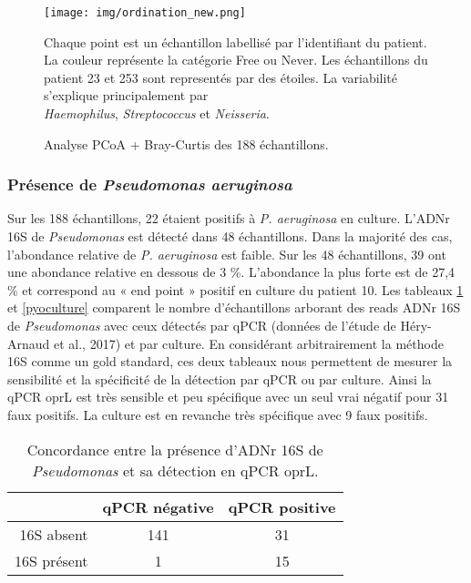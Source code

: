 \documentclass[12pt,a4paper]{article}
\begin{document}
\begin{figure}[H]
\begin{center}
\texttt{[image: img/ordination\_new.png]}\hfill
\caption{Analyse PCoA + Bray-Curtis des 188 échantillons.}
Chaque point est un échantillon labellisé par l'identifiant du patient. La couleur représente la catégorie Free ou Never. Les échantillons du patient 23 et 253 sont representés par des étoiles. La variabilité s'explique principalement par \\ \textit{Haemophilus}, \textit{Streptococcus} et \textit{Neisseria}.
\label{ordination2}
\end{center}
\end{figure}



\subsubsection{Présence de \textit{Pseudomonas aeruginosa}}
Sur les 188 échantillons, 22 étaient positifs à \textit{P. aeruginosa} en culture. L'ADNr 16S de \textit{Pseudomonas} est détecté dans 48 échantillons. Dans la majorité des cas, l'abondance relative de \textit{P. aeruginosa} est faible. Sur les 48 échantillons, 39 ont une abondance relative en dessous de 3 \%. L'abondance la plus forte est de 27,4 \% et correspond au « end point » positif en culture du patient 10.
Les tableaux \ref{pyopcr} et \ref{pyoculture} comparent le nombre d'échantillons arborant des reads ADNr 16S de \textit{Pseudomonas} avec ceux détectés par qPCR (données de l'étude de Héry-Arnaud et al., 2017\cite{Hery-Arnaud2017}) et par culture.
En considérant arbitrairement la méthode 16S comme un gold standard, ces deux tableaux nous permettent de mesurer la sensibilité et la spécificité de la détection par qPCR ou par culture.
Ainsi la qPCR oprL est très sensible et peu spécifique avec un seul vrai négatif pour 31 faux positifs.
La culture est en revanche très spécifique avec 9 faux positifs.

  \begin{table}[!h]
      \centering
            \caption{Concordance entre la présence d'ADNr 16S de \textit{Pseudomonas} et sa détection en qPCR oprL.}

      \begin{tabular}{r|c|c}
           & qPCR négative  & qPCR positive \\
           \hline
           16S absent & 141 & 31 \\
           16S présent & 1 & 15   \\

      \end{tabular}
      \label{pyopcr}
  \end{table}
\end{document}
